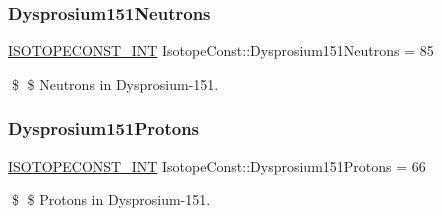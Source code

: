 \subsubsection{\texorpdfstring{Dysprosium151\+Neutrons}{Dysprosium151Neutrons}}
{\footnotesize\ttfamily \mbox{\hyperlink{group___isotope_const-_macros_ga5f18360b3e99483a35c32d789e62621c}{I\+S\+O\+T\+O\+P\+E\+C\+O\+N\+S\+T\+\_\+\+I\+NT}} Isotope\+Const\+::\+Dysprosium151\+Neutrons = 85}

\$ \$ Neutrons in Dysprosium-\/151. \mbox{\label{group___isotope_const-_dysprosium-_dy151_gafc7e9eac973f8d6f0d0cbf22abc0b335}} 
\subsubsection{\texorpdfstring{Dysprosium151\+Protons}{Dysprosium151Protons}}
{\footnotesize\ttfamily \mbox{\hyperlink{group___isotope_const-_macros_ga5f18360b3e99483a35c32d789e62621c}{I\+S\+O\+T\+O\+P\+E\+C\+O\+N\+S\+T\+\_\+\+I\+NT}} Isotope\+Const\+::\+Dysprosium151\+Protons = 66}

\$ \$ Protons in Dysprosium-\/151. 